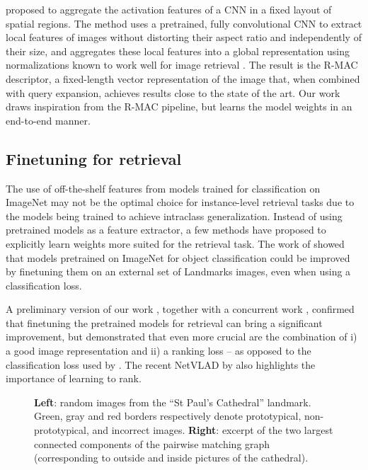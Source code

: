 \documentclass[twocolumn]{svjour3}          \smartqed  \usepackage{graphicx}
\begin{document}
\cite{Tolias2016} proposed to aggregate the activation features of a CNN in a fixed layout of spatial regions.
 The method uses a pretrained, fully convolutional CNN to extract local features of images without distorting their aspect ratio and independently of their size,
 and aggregates these local features into a global representation using normalizations known to work well for image retrieval \citep{Jegou2012}.
 The result is the R-MAC descriptor, a fixed-length vector representation of the image that, when combined with query expansion, achieves results close to the state of the art. 
Our work draws inspiration from the R-MAC pipeline, but learns the model weights in an end-to-end manner.

\subsection{Finetuning for retrieval}
The use of off-the-shelf features from models trained for classification on ImageNet may not be the optimal choice for instance-level retrieval tasks due to the models being trained to achieve intraclass generalization. Instead of using pretrained models as a feature extractor, a few methods have proposed to explicitly learn weights more suited for the retrieval task. The work of \cite{Babenko2014} showed that models pretrained on ImageNet for object classification could be improved by finetuning them on an external set of Landmarks images, even when using a classification loss. 

A preliminary version of our work \citep{gordo2016deep}, together with a concurrent work \citep{Radenovic2016}, confirmed that finetuning the pretrained models for retrieval can bring a significant improvement, but demonstrated that even more crucial are the combination of i) a good image representation and ii) a ranking loss -- as opposed to the classification loss used by \cite{Babenko2014}. The recent NetVLAD by \cite{Arandjelovic2016} also highlights the importance of learning to rank.












\begin{figure*}[t!]
\begin{centering}
\par\end{centering}
\caption{\label{fig:cc}\textbf{Left}: random images from the ``St Paul's Cathedral''
landmark. Green, gray and red borders respectively denote prototypical, non-prototypical, and incorrect images.
\textbf{Right}: excerpt of the two largest connected components of the pairwise matching graph (corresponding
to outside and inside pictures of the cathedral).}
\end{figure*}
\end{document}
